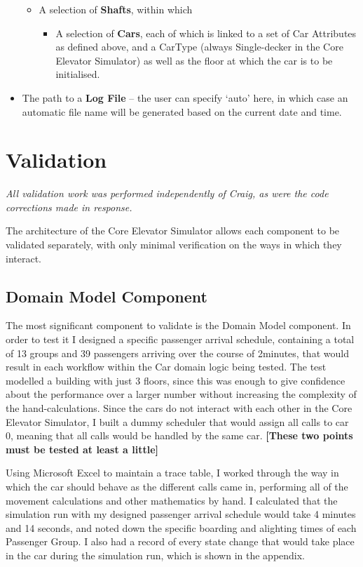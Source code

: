 \documentclass{UoYCSproject}
\begin{document}
\begin{itemize}
	\begin{itemize}
		\item A selection of \textbf{Shafts}, within which
		\begin{itemize}
			\item A selection of \textbf{Cars}, each of which is linked to a set of Car Attributes as defined above, and a CarType (always Single-decker in the Core Elevator Simulator) as well as the floor at which the car is to be initialised.
		\end{itemize}
	\end{itemize}
	\item The path to a \textbf{Log File} -- the user can specify `auto' here, in which case an automatic file name will be generated based on the current date and time.
\end{itemize}

\section{Validation}

\textit{All validation work was performed independently of Craig, as were the code corrections made in response.}

The architecture of the Core Elevator Simulator allows each component to be validated separately, with only minimal verification on the ways in which they interact.

\subsection{Domain Model Component}

The most significant component to validate is the Domain Model component.  In order to test it I designed a specific passenger arrival schedule, containing a total of 13 groups and 39 passengers arriving over the course of 2\textonehalf minutes, that would result in each workflow within the Car domain logic being tested.  The test modelled a building with just 3 floors, since this was enough to give confidence about the performance over a larger number without increasing the complexity of the hand-calculations.  Since the cars do not interact with each other in the Core Elevator Simulator, I built a dummy scheduler that would assign all calls to car 0, meaning that all calls would be handled by the same car. \textbf{[These two points must be tested at least a little]}

Using Microsoft Excel to maintain a trace table, I worked through the way in which the car should behave as the different calls came in, performing all of the movement calculations and other mathematics by hand.  I calculated that the simulation run with my designed passenger arrival schedule would take 4 minutes and 14 seconds, and noted down the specific boarding and alighting times of each Passenger Group.  I also had a record of every state change that would take place in the car during the simulation run, which is shown in the appendix.
\end{document}

